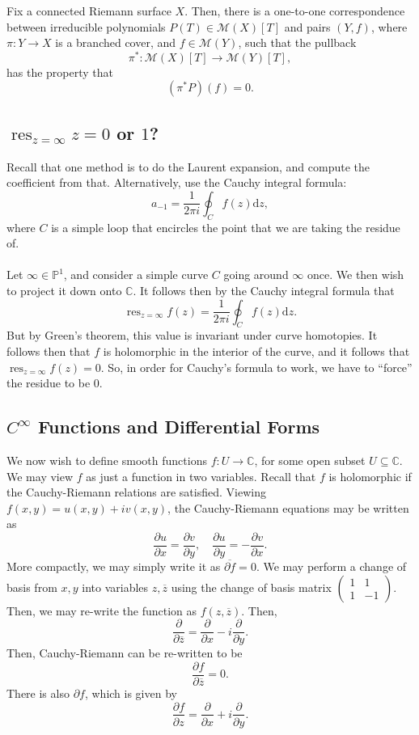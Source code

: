 \documentclass[a4paper]{report}
\theoremstyle{definition}
\theoremstyle{remark}
\theoremstyle{proposition}
\theoremstyle{conjecture}
\theoremstyle{lemma}
\theoremstyle{corollary}
\theoremstyle{exercise}
\theoremstyle{example}
\newcommand{\C}{\mathbb{C}}
\newcommand{\mcal}{\mathcal}
\newcommand{\on}{\operatorname}
\begin{document}
\begin{theorem}
    Fix a connected Riemann surface $X$. Then, there is a one-to-one correspondence between irreducible polynomials $P(T) \in \mcal{M}(X)[T]$ and 
    pairs $(Y,f)$, where $\pi: Y \to X$ is a branched cover, and $f\in \mcal{M}(Y)$, such that the pullback
    $$\pi^\ast : \mcal{M}(X)[T] \longrightarrow \mcal{M}(Y)[T],$$
    has the property that $$(\pi^\ast P)(f)= 0.$$
\end{theorem}

\subsection{$\on{res}_{z=\infty}z = 0$ or $1$?}

Recall that one method is to do the Laurent expansion, and compute the 
coefficient from that. Alternatively, use the Cauchy integral formula:
$$a_{-1} = \frac{1}{2\pi i}\oint_C f(z)\mathrm{d}z,$$
where $C$ is a simple loop that encircles the point that we are taking
the residue of.\\\\
Let $\infty \in \mathbb{P}^1$, and consider a simple curve $C$ going around 
$\infty$ once. We then wish to project it down onto $\C$. 
It follows then by the Cauchy integral formula that 
$$\on{res}_{z=\infty} f(z) = \frac{1}{2\pi i}\oint_C f(z)\mathrm{d}z.$$
But by Green's theorem, this value is invariant under curve homotopies.
It follows then that $f$ is holomorphic in the interior of the curve, and 
it follows that $\on{res}_{z=\infty}f(z) = 0$. So, in order for Cauchy's formula to work, we have to ``force'' the residue to be $0$.

\subsection{$C^\infty$ Functions and Differential Forms}

We now wish to define smooth functions $f : U \to \C$, for some 
open subset $U\subseteq \C$. We may view $f$ as just a function in 
two variables. Recall that $f$ is holomorphic if the Cauchy-Riemann 
relations are satisfied. Viewing $f(x,y) = u(x,y) + iv(x,y)$, 
the Cauchy-Riemann equations may be written as 
$$\frac{\partial u}{\partial x} =\frac{\partial v}{\partial y},\quad \frac{\partial u}{\partial y} = -\frac{\partial v}{\partial x}.$$
More compactly, we may simply write it as $\overline{\partial f} = 0$. 
We may perform a change of basis from $x,y$ into variables 
$z,\overline{z}$ using the change of basis matrix 
$\begin{pmatrix}
    1&1\\
    1&-1
\end{pmatrix}$. Then, we may re-write the function as $f(z,\overline{z})$.
Then, 
$$\frac{\partial}{\partial\overline{z}} = \frac{\partial}{\partial x} -i\frac{\partial}{\partial y}.$$
Then, Cauchy-Riemann can be re-written to be 
$$\frac{\partial f}{\partial \overline{z}} = 0.$$
There is also $\partial f$, which is given by 
$$\frac{\partial f}{\partial z} = \frac{\partial}{\partial x} + i\frac{\partial}{\partial y}.$$
\end{document}
